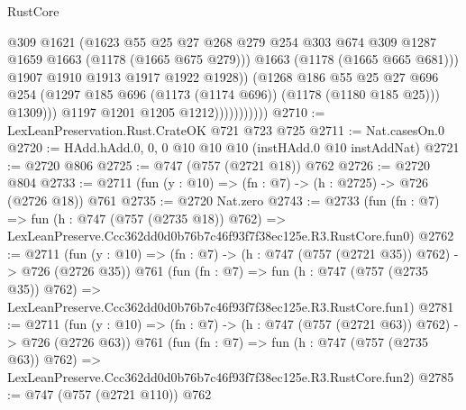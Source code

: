 \begin{lexlean}{RustCore}
\begin{coremodule}
                                    @309
                                    @1621
                                    (@1623
                                      @55
                                      @25
                                      @27
                                      @268
                                      @279
                                      @254
                                      @303
                                      @674
                                      @309
                                      @1287
                                      @1659
                                      @1663
                                      (@1178 (@1665 @675 @279)))
                                    @1663
                                    (@1178 (@1665 @665 @681)))
                                  @1907
                                  @1910
                                  @1913
                                  @1917
                                  @1922
                                  @1928))
                              (@1268
                                @186
                                @55
                                @25
                                @27
                                @696
                                @254
                                (@1297 @185 @696 (@1173 (@1174 @696)) (@1178 (@1180 @185 @25)))
                                @1309)))
                          @1197
                          @1201
                          @1205
                          @1212)))))))))))
@2710 := LexLeanPreservation.Rust.CrateOK @721 @723 @725
@2711 := Nat.casesOn.{0}
@2720 := HAdd.hAdd.{0, 0, 0} @10 @10 @10 (instHAdd.{0} @10 instAddNat)
@2721 := @2720 @806
@2725 := @747 (@757 (@2721 @18)) @762
@2726 := @2720 @804
@2733 := @2711 (fun (y : @10) => (fn : @7) -> (h : @2725) -> @726 (@2726 @18)) @761
@2735 := @2720 Nat.zero
@2743 := @2733
    (fun (fn : @7) =>
    fun (h : @747 (@757 (@2735 @18)) @762) =>
    LexLeanPreserve.Ccc362dd0d0b76b7c46f93f7f38ec125e.R3.RustCore.fun0)
@2762 := @2711
    (fun (y : @10) => (fn : @7) -> (h : @747 (@757 (@2721 @35)) @762) -> @726 (@2726 @35))
    @761
    (fun (fn : @7) =>
    fun (h : @747 (@757 (@2735 @35)) @762) =>
    LexLeanPreserve.Ccc362dd0d0b76b7c46f93f7f38ec125e.R3.RustCore.fun1)
@2781 := @2711
    (fun (y : @10) => (fn : @7) -> (h : @747 (@757 (@2721 @63)) @762) -> @726 (@2726 @63))
    @761
    (fun (fn : @7) =>
    fun (h : @747 (@757 (@2735 @63)) @762) =>
    LexLeanPreserve.Ccc362dd0d0b76b7c46f93f7f38ec125e.R3.RustCore.fun2)
@2785 := @747 (@757 (@2721 @110)) @762

\end{coremodule}
\end{lexlean}
